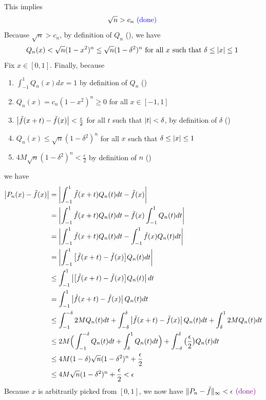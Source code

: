 \documentclass{report}
\begin{document}
\begin{proof*}
This implies 
\begin{align*}
\sqrt{n}>c_n \textcolor{blue}{\text{ (done) }}
\end{align*}
Because $\sqrt{n}>c_n $, by definition of $Q_n$  (), we have 
\begin{align*}
Q_n(x)<\sqrt{n}(1-x^2)^n \leq \sqrt{n}(1-\delta^2)^n \text{ for all $x$ such that  $\delta \leq \left|x\right|\leq 1$ }
\end{align*}
Fix $x \in [0,1]$. Finally, because 
\begin{enumerate}[label=(\alph*)]
  \item $\int_{-1}^1 Q_n(x)dx=1$ by definition of  $Q_n$  ()
  \item $Q_n(x)=c_n(1-x^2)^n\geq 0$ for all $x \in [-1,1]$ 
  \item $\left|\tilde{f}(x+t)-\tilde{f}(x)\right|<\frac{\epsilon}{2} $ for all $t$ such that $\left|t\right|<\delta $, by definition of $\delta $ ()
  \item $Q_n(x)\leq \sqrt{n}(1-\delta^2)^n $ for all $x$ such that  $\delta\leq \left|x\right|\leq 1$
  \item $4M\sqrt{n}(1-\delta^2)^n<\frac{\epsilon}{2} $ by definition of $n$  ()
\end{enumerate}
we have
\begin{align*}
\left|P_n(x)-\tilde{f}(x)\right|&=\left|\int_{-1}^1 \tilde{f}(x+t)Q_n(t)dt- \tilde{f}(x)\right|\\
&=\left|\int_{-1}^1 \tilde{f}(x+t)Q_n(t)dt- \tilde{f}(x)\int_{-1}^1 Q_n(t)dt \right|\\
&=\left|\int_{-1}^1 \tilde{f}(x+t)Q_n(t)dt -\int_{-1}^1 \tilde{f}(x)Q_n(t)dt\right|\\
&=\left|\int_{-1}^1 \big[\tilde{f}(x+t)-\tilde{f}(x)   \big]Q_n(t)dt\right|\\
&\leq \int_{-1}^1 \left|\big[ \tilde{f}(x+t)-\tilde{f}(x)\big]Q_n(t)\right|dt\\
&=\int_{-1}^1 \left|\tilde{f}(x+t)-\tilde{f}(x)  \right|Q_n(t)dt\\
&\leq \int_{-1}^{-\delta} 2MQ_n(t)dt +\int_{-\delta}^{\delta} \left|\tilde{f}(x+t)-\tilde{f}(x)  \right|Q_n(t)dt+\int_{\delta}^1 2M Q_n(t)dt\\
&\leq 2M\Big(\int_{-1}^{-\delta}Q_n(t)dt+\int_{\delta}^1 Q_n(t)dt  \Big)+ \int_{-\delta}^\delta \big(\frac{\epsilon}{2} \big)Q_n(t)dt\\
&\leq 4M(1-\delta) \sqrt{n}(1-\delta^2)^n+ \frac{\epsilon}{2} \\
&\leq 4M\sqrt{n}(1-\delta^2)^n+\frac{\epsilon}{2} <\epsilon  
\end{align*}
Because $x$ is arbitrarily picked from  $[0,1]$, we now have $\| P_n-\tilde{f}  \|_{\infty}<\epsilon \textcolor{violet}{\text{ (done) }}$







\end{proof*}
\end{document}
